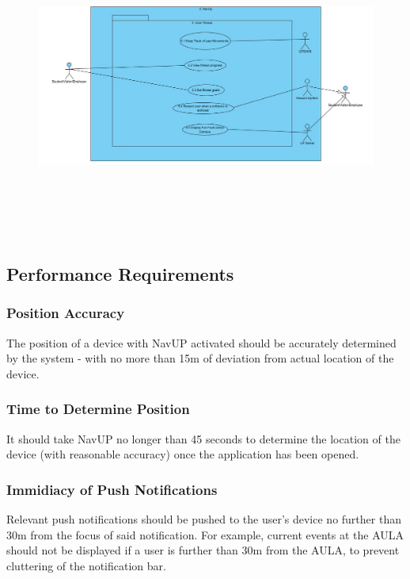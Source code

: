 \documentclass[12pt, a4paper]{article}
\begin{document}
\begin{center}
\begin{itemize}
			\begin{figure}[H]\includegraphics[width = \textwidth, height = 10cm]{User_fitness.JPG} \end{figure}

	\end{itemize}
	\end{center}
		
	\subsection{Performance Requirements}
		\subsubsection{Position Accuracy} The position of a device with NavUP activated should be accurately determined by the system - with no more than 15m of deviation from actual location of the device.
		\subsubsection{Time to Determine Position} It should take NavUP no longer than 45 seconds to determine the location of the device (with reasonable accuracy) once the application has been opened.
		\subsubsection{Immidiacy of Push Notifications} Relevant push notifications should be pushed to the user's device no further than 30m from the focus of said notification. For example, current events at the AULA should not be displayed if a user is further than 30m from the AULA, to prevent cluttering of the notification bar.
\end{document}
